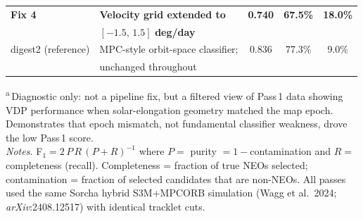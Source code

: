 \begin{table}[ht]
\begin{tabular}{@{}llccc@{}}
\textbf{Fix 4}
  & \textbf{Velocity grid extended to}                 & \textbf{0.740} & \textbf{67.5\%} & \textbf{18.0\%} \\
  & $\mathbf{[-1.5,\,1.5]}$\textbf{ deg/day}          &       &        &        \\[4pt]

\midrule

digest2 (reference)
  & MPC-style orbit-space classifier;                 & 0.836 & 77.3\% &  9.0\% \\
  & unchanged throughout                              &       &        &        \\

\bottomrule
\end{tabular}

\smallskip
\begin{minipage}{\linewidth}
\footnotesize
\textsuperscript{a}\,Diagnostic only: not a pipeline fix, but a filtered view of
Pass\,1 data showing VDP performance when solar-elongation geometry matched the
map epoch.  Demonstrates that epoch mismatch, not fundamental classifier weakness,
drove the low Pass\,1 score.\\[2pt]
\textit{Notes.}
F$_1 = 2\,P\,R\,(P+R)^{-1}$ where $P=$ purity $=1-$contamination and
$R=$ completeness (recall).
Completeness = fraction of true NEOs selected;
contamination = fraction of selected candidates that are non-NEOs.
All passes used the same Sorcha hybrid S3M+MPCORB simulation
(Wagg et al.\ 2024; \textit{arXiv}:2408.12517) with identical tracklet cuts.
\end{minipage}
\end{table}

